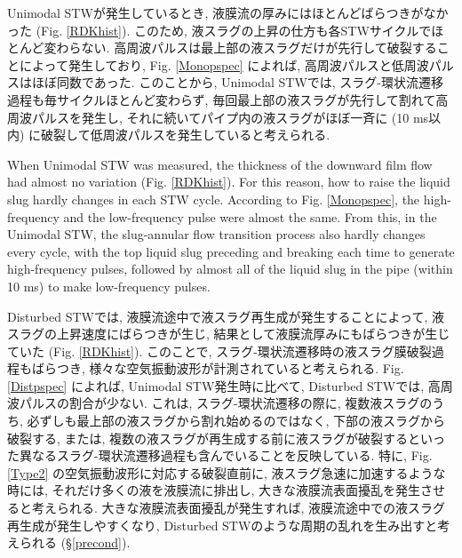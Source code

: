 \documentclass[12pt]{article}
\begin{document}
Unimodal STWが発生しているとき, 液膜流の厚みにはほとんどばらつきがなかった (Fig. \ref{RDKhist}). 
このため, 液スラグの上昇の仕方も各STWサイクルでほとんど変わらない. 
高周波パルスは最上部の液スラグだけが先行して破裂することによって発生しており, Fig. \ref{Monopspec} によれば, 高周波パルスと低周波パルスはほぼ同数であった. 
このことから, Unimodal STWでは, スラグ-環状流遷移過程も毎サイクルほとんど変わらず, 毎回最上部の液スラグが先行して割れて高周波パルスを発生し, それに続いてパイプ内の液スラグがほぼ一斉に (10 ms以内) に破裂して低周波パルスを発生していると考えられる.

When Unimodal STW was measured, the thickness of the downward film flow had almost no variation (Fig. \ref{RDKhist}).
For this reason, how to raise the liquid slug hardly changes in each STW cycle.
According to Fig. \ref{Monopspec}, the high-frequency and the low-frequency pulse were almost the same.
From this, in the Unimodal STW, the slug-annular flow transition process also hardly changes every cycle, with the top liquid slug preceding and breaking each time to generate high-frequency pulses, followed by almost all of the liquid slug in the pipe (within 10 ms) to make low-frequency pulses.


Disturbed STWでは, 液膜流途中で液スラグ再生成が発生することによって, 液スラグの上昇速度にばらつきが生じ, 結果として液膜流厚みにもばらつきが生じていた (Fig. \ref{RDKhist}). 
このことで, スラグ-環状流遷移時の液スラグ膜破裂過程もばらつき, 様々な空気振動波形が計測されていると考えられる. 
Fig. \ref{Distpspec} によれば, Unimodal STW発生時に比べて, Disturbed STWでは, 高周波パルスの割合が少ない. 
これは, スラグ-環状流遷移の際に, 複数液スラグのうち, 必ずしも最上部の液スラグから割れ始めるのではなく, 下部の液スラグから破裂する, または, 複数の液スラグが再生成する前に液スラグが破裂するといった異なるスラグ-環状流遷移過程も含んでいることを反映している.
特に, Fig. \ref{Type2} の空気振動波形に対応する破裂直前に, 液スラグ急速に加速するような時には, それだけ多くの液を液膜流に排出し, 大きな液膜流表面擾乱を発生させると考えられる. 大きな液膜流表面擾乱が発生すれば, 液膜流途中での液スラグ再生成が発生しやすくなり, Disturbed STWのような周期の乱れを生み出すと考えられる (\S \ref{precond}). 
\end{document}
